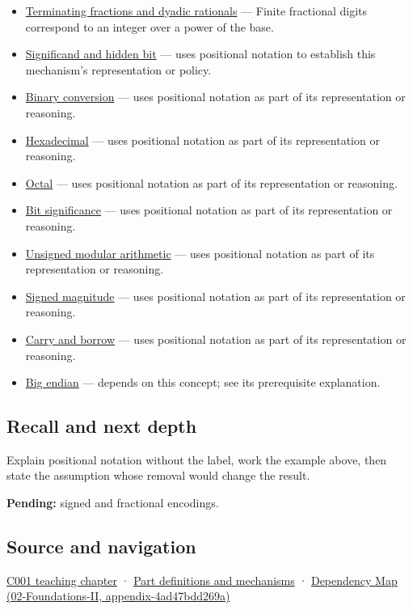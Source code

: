 \begin{itemize}
\item
  \hyperref[appendix-2a2f1b74bdd3]{Terminating fractions and dyadic rationals} --- Finite fractional digits correspond to an integer over a power of the base.
\item
  \hyperref[appendix-a24fd710cf67]{Significand and hidden bit} --- uses positional notation to establish this mechanism's representation or policy.
\item
  \hyperref[appendix-dc552784a2c0]{Binary conversion} --- uses positional notation as part of its representation or reasoning.
\item
  \hyperref[appendix-6b8075763724]{Hexadecimal} --- uses positional notation as part of its representation or reasoning.
\item
  \hyperref[appendix-17fc1bc8b305]{Octal} --- uses positional notation as part of its representation or reasoning.
\item
  \hyperref[appendix-280445746493]{Bit significance} --- uses positional notation as part of its representation or reasoning.
\item
  \hyperref[appendix-c99977d88b33]{Unsigned modular arithmetic} --- uses positional notation as part of its representation or reasoning.
\item
  \hyperref[appendix-ce20506c8532]{Signed magnitude} --- uses positional notation as part of its representation or reasoning.
\item
  \hyperref[appendix-d52d5f78ffd1]{Carry and borrow} --- uses positional notation as part of its representation or reasoning.
\item
  \hyperref[appendix-92e040df969a]{Big endian} --- depends on this concept; see its prerequisite explanation.
\end{itemize}

\subsection{Recall and next depth}\label{appendix-83c3f28f7bda-recall-and-next-depth}

Explain positional notation without the label, work the example above, then state the assumption whose removal would change the result.

\textbf{Pending:} signed and fractional encodings.

\subsection{Source and navigation}\label{appendix-83c3f28f7bda-source-and-navigation}

\hyperref[01-foundations-i-ch001-from-a-signal-to-an-interpretation]{C001 teaching chapter} · \hyperref[appendix-fd090d982a15]{Part definitions and mechanisms} · \href{../02-Foundations-II/main.pdf\#nameddest=appendix-4ad47bdd269a}{Dependency Map (02-Foundations-II, appendix-4ad47bdd269a)}
